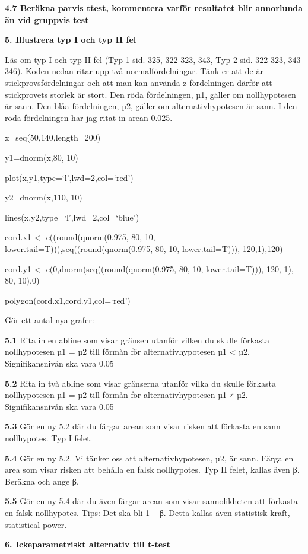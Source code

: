 \documentclass[
  letterpaper,
  DIV=11,
  numbers=noendperiod]{scrartcl}
\begin{document}
\textbf{4.7 Beräkna parvis ttest, kommentera varför resultatet blir
annorlunda än vid gruppvis test}

\textbf{5. Illustrera typ I och typ II fel}

Läs om typ I och typ II fel (Typ 1 sid. 325, 322-323, 343, Typ 2 sid.
322-323, 343-346). Koden nedan ritar upp två normalfördelningar. Tänk er
att de är stickprovsfördelningar och att man kan använda z-fördelningen
därför att stickprovets storlek är stort. Den röda fördelningen, µ1,
gäller om nollhypotesen är sann. Den blåa fördelningen, µ2, gäller om
alternativhypotesen är sann. I den röda fördelningen har jag ritat in
arean 0.025.

x=seq(50,140,length=200)

y1=dnorm(x,80, 10)

plot(x,y1,type=`l',lwd=2,col=`red')

y2=dnorm(x,110, 10)

lines(x,y2,type=`l',lwd=2,col=`blue')

cord.x1 \textless- c((round(qnorm(0.975, 80, 10,
lower.tail=T))),seq((round(qnorm(0.975, 80, 10, lower.tail=T))),
120,1),120)

cord.y1 \textless- c(0,dnorm(seq((round(qnorm(0.975, 80, 10,
lower.tail=T))), 120, 1), 80, 10),0)

polygon(cord.x1,cord.y1,col=`red')

Gör ett antal nya grafer:

\textbf{5.1} Rita in en abline som visar gränsen utanför vilken du
skulle förkasta nollhypotesen µ1 = µ2 till förmån för
alternativhypotesen µ1 \textless{} µ2. Signifikansnivån ska vara 0.05

\textbf{5.2} Rita in två abline som visar gränserna utanför vilka du
skulle förkasta nollhypotesen µ1 = µ2 till förmån för
alternativhypotesen µ1 ≠ µ2. Signifikansnivån ska vara 0.05

\textbf{5.3} Gör en ny 5.2 där du färgar arean som visar risken att
förkasta en sann nollhypotes. Typ I felet.

\textbf{5.4} Gör en ny 5.2. Vi tänker oss att alternativhypotesen, µ2,
är sann. Färga en area som visar risken att behålla en falsk
nollhypotes. Typ II felet, kallas även β. Beräkna och ange β.

\textbf{5.5} Gör en ny 5.4 där du även färgar arean som visar
sannolikheten att förkasta en falsk nollhypotes. Tips: Det ska bli 1 --
β. Detta kallas även statistisk kraft, statistical power.

\textbf{6. Ickeparametriskt alternativ till t-test}
\end{document}
